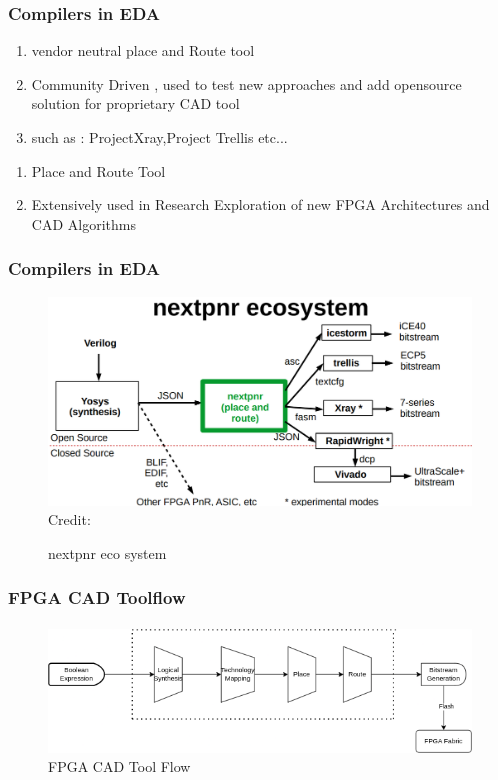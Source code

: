 \documentclass{beamer}
\begin{document}
\begin{frame}[fragile]
   \frametitle{Compilers in EDA}
   \begin{enumerate}
   	\item vendor neutral place and Route tool 
	\item Community Driven , used to test new approaches and add opensource solution for proprietary CAD tool
	\item such as : ProjectXray,Project Trellis etc...
   \end{enumerate}
   \begin{enumerate}
   	\item Place and Route Tool 
	\item Extensively used in Research Exploration of new FPGA Architectures and CAD Algorithms
   \end{enumerate}
\end{frame}


\begin{frame}[fragile]
   \frametitle{Compilers in EDA}
     \begin{figure}
         \centering
	 \includegraphics[width=1\linewidth]{images/nextpnr_ecosystem.png}
	 \hspace*{1pt}\hbox{\scriptsize Credit:}
	 \caption{nextpnr eco system}
	 \label{exa_nextpnr}
     \end{figure}
\end{frame}
\begin{frame}[fragile]
  \frametitle{FPGA CAD Toolflow}
  \framesubtitle{}
   \begin{figure}
        \centering
        \includegraphics[width=1\linewidth]{images/cad_flow_fl.png}
        \caption{FPGA CAD Tool Flow}
        \label{exa_cadflow}
    \end{figure}
   
\end{frame}
\end{document}
